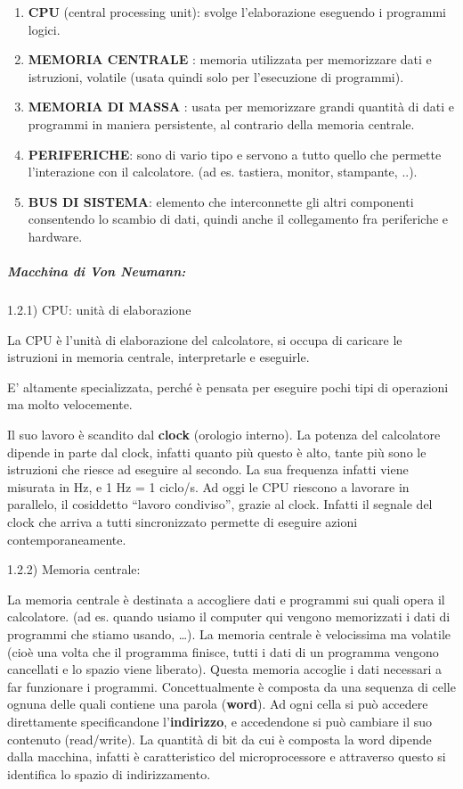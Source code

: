 \documentclass[
  paper=a4,
  oneside  ,captions=tableheading
]{scrbook}
\providecommand{\tightlist}{%
  \setlength{\itemsep}{0pt}\setlength{\parskip}{0pt}}
\begin{document}
\begin{enumerate}
\def\labelenumi{\arabic{enumi}.}
\tightlist
\item
  \textbf{CPU} (central processing unit): svolge l'elaborazione
  eseguendo i programmi logici.
\item
  \textbf{MEMORIA CENTRALE }: memoria utilizzata per memorizzare dati e
  istruzioni, volatile (usata quindi solo per l'esecuzione di
  programmi).
\item
  \textbf{MEMORIA DI MASSA }: usata per memorizzare grandi quantità di
  dati e programmi in maniera persistente, al contrario della memoria
  centrale.
\item
  \textbf{PERIFERICHE}: sono di vario tipo e servono a tutto quello che
  permette l'interazione con il calcolatore. (ad es. tastiera, monitor,
  stampante, ..).
\item
  \textbf{BUS DI SISTEMA}: elemento che interconnette gli altri
  componenti consentendo lo scambio di dati, quindi anche il
  collegamento fra periferiche e hardware.
\end{enumerate}

\hypertarget{macchina-di-von-neumann}{%
\subparagraph{Macchina di Von Neumann:}\label{macchina-di-von-neumann}}

1.2.1) CPU: unità di elaborazione

La CPU è l'unità di elaborazione del calcolatore, si occupa di caricare
le istruzioni in memoria centrale, interpretarle e eseguirle.

E' altamente specializzata, perché è pensata per eseguire pochi tipi di
operazioni ma molto velocemente.

Il suo lavoro è scandito dal \textbf{clock} (orologio interno). La
potenza del calcolatore dipende in parte dal clock, infatti quanto più
questo è alto, tante più sono le istruzioni che riesce ad eseguire al
secondo. La sua frequenza infatti viene misurata in Hz, e 1 Hz = 1
ciclo/s. Ad oggi le CPU riescono a lavorare in parallelo, il cosiddetto
``lavoro condiviso'', grazie al clock. Infatti il segnale del clock che
arriva a tutti sincronizzato permette di eseguire azioni
contemporaneamente.

1.2.2) Memoria centrale:

La memoria centrale è destinata a accogliere dati e programmi sui quali
opera il calcolatore. (ad es. quando usiamo il computer qui vengono
memorizzati i dati di programmi che stiamo usando, \ldots). La memoria
centrale è velocissima ma volatile (cioè una volta che il programma
finisce, tutti i dati di un programma vengono cancellati e lo spazio
viene liberato). Questa memoria accoglie i dati necessari a far
funzionare i programmi. Concettualmente è composta da una sequenza di
celle ognuna delle quali contiene una parola (\textbf{word}). Ad ogni
cella si può accedere direttamente specificandone l'\textbf{indirizzo},
e accedendone si può cambiare il suo contenuto (read/write). La quantità
di bit da cui è composta la word dipende dalla macchina, infatti è
caratteristico del microprocessore e attraverso questo si identifica lo
spazio di indirizzamento.
\end{document}
